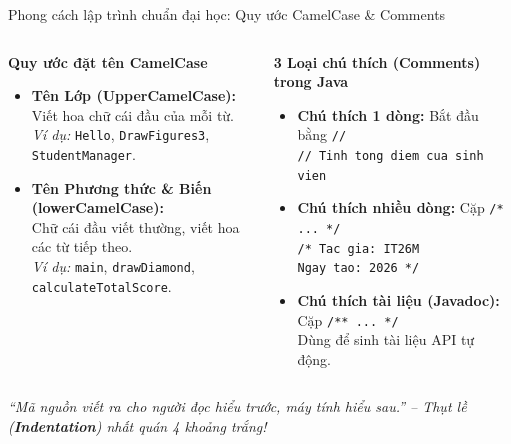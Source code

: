 \documentclass[aspectratio=169, 10pt]{beamer}
\begin{document}
\begin{frame}{Phong cách lập trình chuẩn đại học: Quy ước CamelCase \& Comments}
  \begin{columns}[t]
    \begin{block}{\textbf{Quy ước đặt tên CamelCase}}
      \begin{itemize}\small
        \item \textbf{Tên Lớp (UpperCamelCase):}\\
          Viết hoa chữ cái đầu của mỗi từ.\\
          \textit{Ví dụ:} \texttt{Hello}, \texttt{DrawFigures3}, \texttt{StudentManager}.
        \item \textbf{Tên Phương thức \& Biến (lowerCamelCase):}\\
          Chữ cái đầu viết thường, viết hoa các từ tiếp theo.\\
          \textit{Ví dụ:} \texttt{main}, \texttt{drawDiamond}, \texttt{calculateTotalScore}.
      \end{itemize}
    \end{block}

    \begin{block}{\textbf{3 Loại chú thích (Comments) trong Java}}
      \begin{itemize}\small
        \item \textbf{Chú thích 1 dòng:} Bắt đầu bằng \texttt{//}\\
          \texttt{// Tinh tong diem cua sinh vien}
        \item \textbf{Chú thích nhiều dòng:} Cặp \texttt{/* ... */}\\
          \texttt{/* Tac gia: IT26M} \\
          \texttt{\phantom{/* }Ngay tao: 2026 */}
        \item \textbf{Chú thích tài liệu (Javadoc):} Cặp \texttt{/** ... */}\\
          Dùng để sinh tài liệu API tự động.
      \end{itemize}
    \end{block}
  \end{columns}

  \vspace{2mm}
  \begin{center}
    \small\textit{``Mã nguồn viết ra cho người đọc hiểu trước, máy tính hiểu sau.'' -- Thụt lề (\textbf{Indentation}) nhất quán 4 khoảng trắng!}
  \end{center}
\end{frame}
\end{document}
